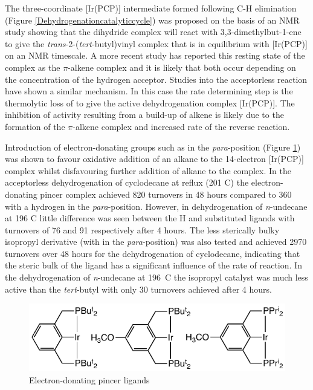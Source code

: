 The three-coordinate [Ir(PCP)] intermediate formed following C-H elimination (Figure \ref{Dehydrogenationcatalyticcycle}) was proposed on the basis of an NMR study showing that the dihydride complex will react with 3,3-dimethylbut-1-ene to give the \emph{trans}-2-(\emph{tert}-butyl)vinyl complex that is in equilibrium with [Ir(PCP)] on an NMR timescale.\cite{Kanzelberger2000}  A more recent study has reported this resting state of the complex as the $\pi$-alkene complex and it is likely that both occur depending on the concentration of the hydrogen acceptor.\cite{Choi2011}  Studies into the acceptorless reaction have shown a similar mechanism.\cite{Krogh2002, Krogh2002b}  In this case the rate determining step is the thermolytic loss of  to give the active dehydrogenation complex [Ir(PCP)].  The inhibition of activity resulting from a build-up of alkene is likely due to the formation of the $\pi$-alkene complex and increased rate of the reverse reaction.\cite{Krogh2002, Krogh2002b}

Introduction of electron-donating groups such as  in the \emph{para}-position (Figure \ref{DFTpincers}) was shown to favour oxidative addition of an alkane to the 14-electron [Ir(PCP)] complex whilst disfavouring further addition of alkane to the \ce{[(PCP)Ir(R)(H)]} complex.\cite{Krogh2002c}  In the acceptorless dehydrogenation of cyclodecane at reflux (201 \degrees C) the electron-donating  pincer complex achieved 820 turnovers in 48 hours compared to 360 with a hydrogen in the \emph{para}-position.\cite{Zhu2004}   However, in dehydrogenation of \emph{n}-undecane at 196 \degrees C little difference was seen between the H and  substituted ligands with turnovers of 76 and 91 respectively after 4 hours.  The less sterically bulky isopropyl derivative (with  in the \emph{para}-position) was also tested and achieved 2970 turnovers over 48 hours for the dehydrogenation of cyclodecane, indicating that the steric bulk of the ligand has a significant influence of the rate of reaction.\cite{Zhu2004}   In the dehydrogenation of \emph{n}-undecane at 196~\degrees C the isopropyl catalyst was much less active than the \emph{tert}-butyl with only 30 turnovers achieved after 4 hours.  	

\begin{figure}[ht]
\centering
\includegraphics[]{../Figures/DFTpincers.pdf}
\caption[Electron-donating pincer ligands]{Electron-donating pincer ligands}
\label{DFTpincers}
\end{figure}

